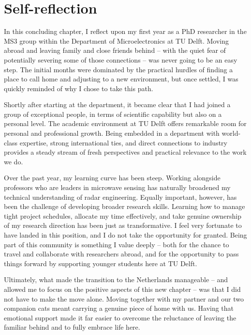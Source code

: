 \chapter*{Self-reflection}
\label{chap:self-reflection}


In this concluding chapter, I reflect upon my first year as a PhD researcher in the MS3 group within the Department of Microelectronics at TU Delft.
Moving abroad and leaving family and close friends behind -- with the quiet fear of potentially severing some of those connections -- was never going to be an easy step.
The initial months were dominated by the practical hurdles of finding a place to call home and adjusting to a new environment, but once settled, I was quickly reminded of why I chose to take this path.

Shortly after starting at the department, it became clear that I had joined a group of exceptional people, in terms of scientific capability but also on a personal level.
The academic environment at TU Delft offers remarkable room for personal and professional growth.
Being embedded in a department with world-class expertise, strong international ties, and direct connections to industry provides a steady stream of fresh perspectives and practical relevance to the work we do.

Over the past year, my learning curve has been steep.
Working alongside professors who are leaders in microwave sensing has naturally broadened my technical understanding of radar engineering.
Equally important, however, has been the challenge of developing broader research skills.
Learning how to manage tight project schedules, allocate my time effectively, and take genuine ownership of my research direction has been just as transformative.
I feel very fortunate to have landed in this position, and I do not take the opportunity for granted.
Being part of this community is something I value deeply -- both for the chance to travel and collaborate with researchers abroad, and for the opportunity to pass things forward by supporting younger students here at TU Delft.

Ultimately, what made the transition to the Netherlands manageable -- and allowed me to focus on the positive aspects of this new chapter -- was that I did not have to make the move alone.
Moving together with my partner and our two companion cats meant carrying a genuine piece of home with us.
Having that emotional support made it far easier to overcome the reluctance of leaving the familiar behind and to fully embrace life here.
